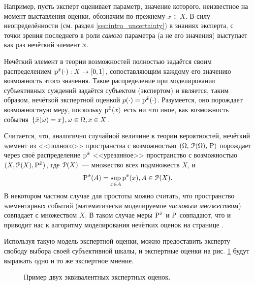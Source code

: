 Например, пусть эксперт оценивает параметр, значение которого, неизвестное на момент выставления оценки, обозначим по-прежнему $x \in X$. В силу неопределённости (см. раздел \ref{sec:intro_uncertainty}) в знаниях эксперта, с точки зрения последнего в роли \emph{самого} параметра (а не его значения) выступает как раз нечёткий элемент $\tilde x$.

Нечёткий элемент в теории возможностей полностью задаётся своим распределением $\p^{\tilde x}(\cdot): X \rightarrow \zo$, сопоставляющим каждому его значению возможность этого значения. Такое распределение при моделировании субъективных суждений задаётся субъектом (экспертом) и является, таким образом, нечёткой экспертной оценкой $p(\cdot) = \p^{\tilde x}(\cdot)$. Разумеется, оно порождает возможностную меру, поскольку $\p^{\tilde x}(x)$ есть ни что иное, как возможность события $\{\tilde x(\om) = x\}, \om \in \Om, x \in X$.

Считается, что, аналогично случайной величине в теории вероятностей, нечёткий элемент из <<полного>> пространства с возможностью $\OAP$ порождает через своё распределение $\p^{\tilde x}$ <<урезанное>> пространство с возможностью $(X, \Po(X), \P^{\tilde x})$, где $\Po(X)$~--- множество всех подмножеств $X$, и
\begin{equation*}
	\P^{\tilde x}(A) = \sup_{x \in A} \p^{\tilde x}(x), A \in \Po(X).
\end{equation*} 
В некотором частном случае для простоты можно считать, что пространство элементарных событий (математически моделируемое \emph{числовым множеством}) совпадает с множеством $X$. В таком случае меры $\P^{\tilde x}$ и $\P$ совпадают, что и приводит нас к алгоритму моделирования нечётких оценок на странице \pageref{zadeh_fuzzy_asset_alg}.

Используя такую модель экспертной оценки, можно предоставить эксперту свободу выбора своей субъективной шкалы, и экспертные оценки на рис. \ref{ris:fuzzy_ass03} будут выражать одно и то же экспертное мнение.
\begin{figure}[h]
\caption{\small Пример двух эквивалентных экспертных оценок.}
\label{ris:fuzzy_ass03}
\end{figure}

